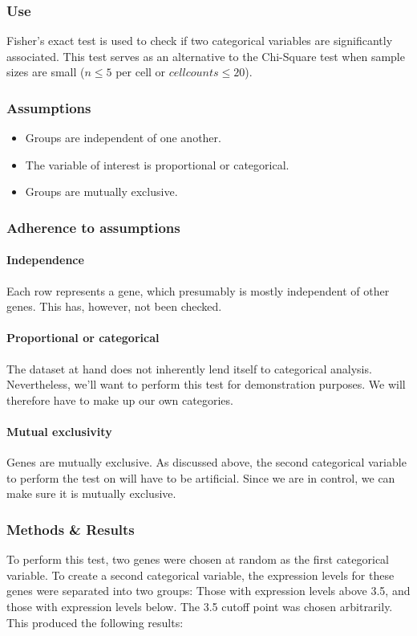 \subsubsection{Use}
Fisher's exact test is used to check if two categorical variables are significantly associated.
This test serves as an alternative to the Chi-Square test when sample sizes are small ($n \le 5$ per cell or $cell counts \le 20$).

\subsubsection{Assumptions}
\begin{itemize}
    \item Groups are independent of one another.
    \item The variable of interest is proportional or categorical.
    \item Groups are mutually exclusive.
\end{itemize}

\subsubsection{Adherence to assumptions}
\paragraph{Independence}
Each row represents a gene, which presumably is mostly independent of other genes.
This has, however, not been checked.

\paragraph{Proportional or categorical}
The dataset at hand does not inherently lend itself to categorical analysis.
Nevertheless, we'll want to perform this test for demonstration purposes.
We will therefore have to make up our own categories.

\paragraph{Mutual exclusivity}
Genes are mutually exclusive.
As discussed above, the second categorical variable to perform the test on will have to be artificial.
Since we are in control, we can make sure it is mutually exclusive.

\subsubsection{Methods \& Results}
To perform this test, two genes were chosen at random as the first categorical variable.
To create a second categorical variable, the expression levels for these genes were separated into two groups:
Those with expression levels above 3.5, and those with expression levels below.
The 3.5 cutoff point was chosen arbitrarily.
This produced the following results:

